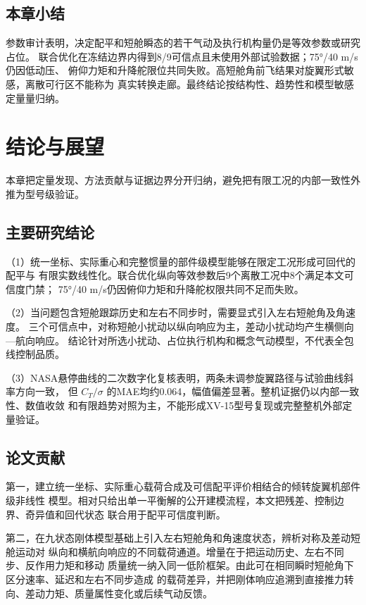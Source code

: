 \documentclass[UTF8,12pt,oneside,openany,fontset=windows]{ctexbook}
\begin{document}
\section{本章小结}

参数审计表明，决定配平和短舱瞬态的若干气动及执行机构量仍是等效参数或研究占位。 联合优化在冻结边界内得到8/9可信点且未使用外部试验数据；75°/40 m/s仍因低动压、 俯仰力矩和升降舵限位共同失败。高短舱角前飞结果对旋翼形式敏感，离散可行区不能称为 真实转换走廊。最终结论按结构性、趋势性和模型敏感定量量归纳。

\chapter{结论与展望}

本章把定量发现、方法贡献与证据边界分开归纳，避免把有限工况的内部一致性外推为型号级验证。

\section{主要研究结论}

（1）统一坐标、实际重心和完整惯量的部件级模型能够在限定工况形成可回代的配平与 有限实数线性化。联合优化纵向等效参数后9个离散工况中8个满足本文可信度门禁； 75°/40 m/s仍因俯仰力矩和升降舵权限共同不足而失败。

（2）当问题包含短舱跟踪历史和左右不同步时，需要显式引入左右短舱角及角速度。 三个可信点中，对称短舱小扰动以纵向响应为主，差动小扰动均产生横侧向—航向响应。 结论针对所选小扰动、占位执行机构和概念气动模型，不代表全包线控制品质。

（3）NASA悬停曲线的二次数字化复核表明，两条未调参旋翼路径与试验曲线斜率方向一致， 但 \(C_T/\sigma\) 的MAE均约0.064，幅值偏差显著。整机证据仍以内部一致性、数值收敛 和有限趋势对照为主，不能形成XV-15型号复现或完整整机外部定量验证。

\section{论文贡献}

第一，建立统一坐标、实际重心载荷合成及可信配平评价相结合的倾转旋翼机部件级非线性 模型。相对只给出单一平衡解的公开建模流程，本文把残差、控制边界、奇异值和回代状态 联合用于配平可信度判断。

第二，在九状态刚体模型基础上引入左右短舱角和角速度状态，辨析对称及差动短舱运动对 纵向和横航向响应的不同载荷通道。增量在于把运动历史、左右不同步、反作用力矩和移动 质量统一纳入同一低阶框架。由此可在相同瞬时短舱角下区分速率、延迟和左右不同步造成 的载荷差异，并把刚体响应追溯到直接推力转向、差动力矩、质量属性变化或后续气动反馈。
\end{document}

